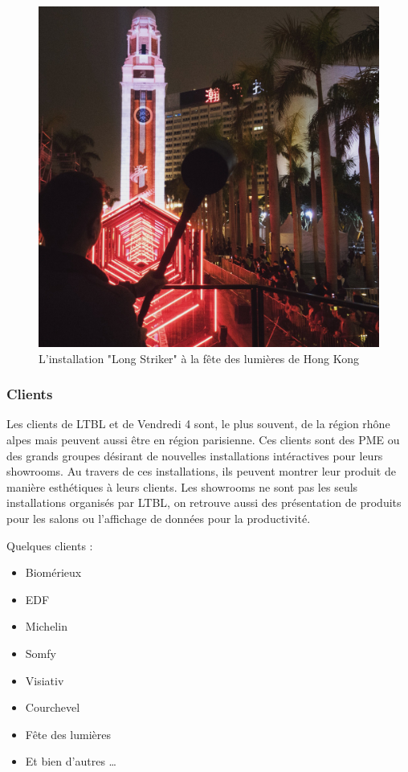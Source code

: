 \documentclass{article}
\begin{document}
\begin{figure}[h]
    \centering
    \includegraphics[scale=0.1]{long-striker.jpg}
    \caption{L'installation "Long Striker" à la fête des lumières de Hong Kong}
\end{figure}

\clearpage

\subsubsection{Clients}

Les clients de LTBL et de Vendredi 4 sont, le plus souvent, de la région rhône alpes mais peuvent aussi être en région parisienne.
Ces clients sont des PME ou des grands groupes désirant de nouvelles installations intéractives pour leurs showrooms.
Au travers de ces installations, ils peuvent montrer leur produit de manière esthétiques à leurs clients.
Les showrooms ne sont pas les seuls installations organisés par LTBL, on retrouve aussi des présentation de produits pour les salons ou l'affichage de données pour la productivité.

\medskip

Quelques clients :

\begin{itemize}
    \item Biomérieux
    \item EDF
    \item Michelin
    \item Somfy
    \item Visiativ
    \item Courchevel
    \item Fête des lumières
    \item Et bien d'autres \ldots
\end{itemize}
\end{document}
